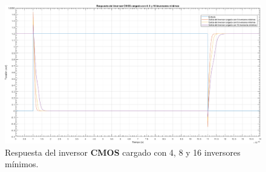 \begin{figure}[H] %
\begin{center}
\includegraphics[width=0.92 \textheight, angle=90]{./img/point2/4_8_16_inverters_load_response}
\caption{\label{fig:fig_inverter_multiple_load_response}\footnotesize{Respuesta del inversor \textbf{CMOS} cargado con 4, 8 y 16 inversores mínimos.}}
\end{center}
\end{figure}





